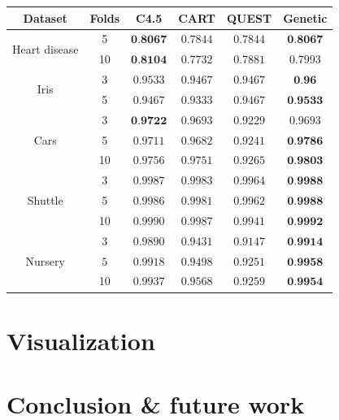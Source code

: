 \documentclass[english]{beamer}
\begin{document}
\begin{frame}{}
	\vspace{-1em}
	\begin{table}
		\begin{tabular}{|c|c|c|c|c|c|}
			\hline \textbf{Dataset} & \textbf{Folds} & \textbf{C4.5} & \textbf{CART} & \textbf{QUEST} & \textbf{Genetic} \\ \hline
			\multirow{2}{*}{Heart disease} & 5 & $\textbf{0.8067}$ & $0.7844$ & $0.7844$ & $\textbf{0.8067}$ \\
			& 10 & $\textbf{0.8104}$ & $0.7732$ & $0.7881$ & $0.7993$ \\ \hline
			\multirow{2}{*}{Iris} & 3 & $0.9533$ & $0.9467$ & $0.9467$ & $\textbf{0.96}$ \\ & 5 & $0.9467$ & $0.9333$ & $0.9467$ & $\textbf{0.9533}$ \\ \hline
			\multirow{3}{*}{Cars} & 3 & $\textbf{0.9722}$ & $0.9693$ & $0.9229$ & $0.9693$ \\
			& 5 & $0.9711$ & $0.9682$ & $0.9241$ & $\textbf{0.9786}$ \\
			& 10 & $0.9756$ & $0.9751$ & $0.9265$ & $\textbf{0.9803}$ \\ \hline
			\multirow{3}{*}{Shuttle} & 3 & $0.9987$ & $0.9983$ & $0.9964$ & $\textbf{0.9988}$  \\
			& 5 & $0.9986$ & $0.9981$ & $0.9962$ & $\textbf{0.9988}$ \\
			& 10 & $0.9990$ & $0.9987$ & $0.9941 $ & $\textbf{0.9992}$ \\ \hline
			\multirow{3}{*}{Nursery} & 3 & $0.9890$ & $0.9431$ & $0.9147$ & $\textbf{0.9914}$ \\
			& $5$ & $0.9918$ & $0.9498$ & $0.9251$ & $\textbf{0.9958}$ \\
			& 10 & $0.9937$ & $0.9568$ & $0.9259$ & $\textbf{0.9954}$ \\ \hline
		\end{tabular}
	\end{table}
\end{frame}


\section{Visualization}
\section{Conclusion \& future work}




\end{document}
